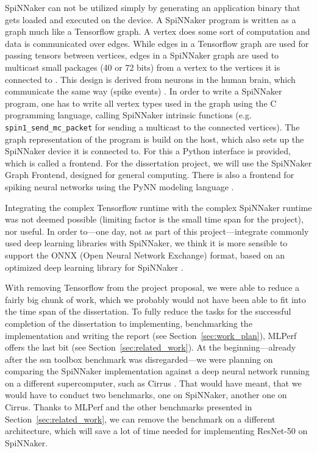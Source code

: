 \documentclass{article}
\begin{document}
SpiNNaker can not be utilized simply by generating an application
binary that gets loaded and executed on the device.
A SpiNNaker program is written as a graph much like a Tensorflow
graph.
A vertex does some sort of computation and data is communicated over
edges.
While edges in a Tensorflow graph are used for passing tensors between
vertices, edges in a SpiNNaker graph are used to multicast small
packages (40 or 72 bits) from a vertex to the vertices it is connected
to \citep{spinn_proj, tf2015}.
This design is derived from neurons in the human brain, which
communicate the same way (spike events) \citep{spinn_proj}.
In order to write a SpiNNaker program, one has to write all vertex
types used in the graph using the C programming language, calling
SpiNNaker intrinsic functions (e.g. \texttt{spin1\_send\_mc\_packet}
for sending a multicast to the connected vertices).
The graph representation of the program is build on the host,
which also sets up the SpiNNaker device it is connected to.
For this a Python interface is provided, which is called a frontend.
For the dissertation project, we will use the SpiNNaker Graph
Frontend, designed for general computing.
There is also a frontend for spiking neural networks using
the PyNN modeling language \citep{davison_et_al_2009}.

Integrating the complex Tensorflow runtime with the complex
SpiNNaker runtime was not deemed possible (limiting factor is the
small time span for the project), nor useful.
In order to---one day, not as part of this project---integrate
commonly used deep learning libraries with SpiNNaker, we think it
is more sensible to support the ONNX (Open Neural Network Exchange)
format, based on an optimized deep learning library for SpiNNaker
\citep{bai2020}.

With removing Tensorflow from the project proposal, we
were able to reduce a fairly big chunk of work, which we
probably would not have been able to fit into the time
span of the dissertation.
To fully reduce the tasks for the successful
completion of the dissertation to implementing,
benchmarking the implementation and writing the report
(see Section~\ref{sec:work_plan}), MLPerf offers the last
bit (see Section~\ref{sec:related_work}).
At the beginning---already after the ssn toolbox benchmark
was disregarded---we were planning on comparing the
SpiNNaker implementation against a deep neural network
running on a different supercomputer, such as Cirrus
\citep{cirrus}.
That would have meant, that we would have to conduct two
benchmarks, one on SpiNNaker, another one on Cirrus.
Thanks to MLPerf and the other benchmarks presented in
Section~\ref{sec:related_work}, we can remove the
benchmark on a different architecture, which will save
a lot of time needed for implementing ResNet-50 on
SpiNNaker.
\end{document}
